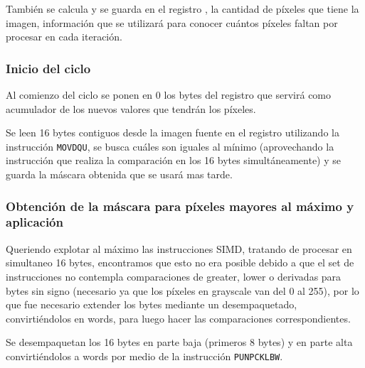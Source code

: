 También se calcula y se guarda en el registro \rcx, la cantidad de píxeles que tiene la imagen, información que se utilizará para conocer cuántos píxeles faltan por procesar en cada iteración.

\subsubsection{Inicio del ciclo}
Al comienzo del ciclo se ponen en 0 los bytes del registro  que servirá como acumulador de los nuevos valores que tendrán los píxeles.

Se leen 16 bytes contiguos desde la imagen fuente en el registro  utilizando la instrucción \texttt{MOVDQU}, se busca cuáles son iguales al mínimo (aprovechando la instrucción  que realiza la comparación en los 16 bytes simultáneamente) y se guarda la máscara obtenida que se usará mas tarde.

\subsubsection{Obtención de la máscara para píxeles mayores al máximo y aplicación}

Queriendo explotar al máximo las instrucciones SIMD, tratando de procesar en simultaneo 16 bytes, encontramos que esto no era posible debido a que el set de instrucciones no contempla comparaciones de greater, lower o derivadas para bytes sin signo (necesario ya que los píxeles en grayscale van del 0 al 255), por lo que fue necesario extender los bytes mediante un desempaquetado, convirtiéndolos en words, para luego hacer las comparaciones correspondientes.

Se desempaquetan los 16 bytes en parte baja (primeros 8 bytes) y en parte alta convirtiéndolos a words por medio de la instrucción \texttt{PUNPCKLBW}.

\begin{center}
\end{center}

